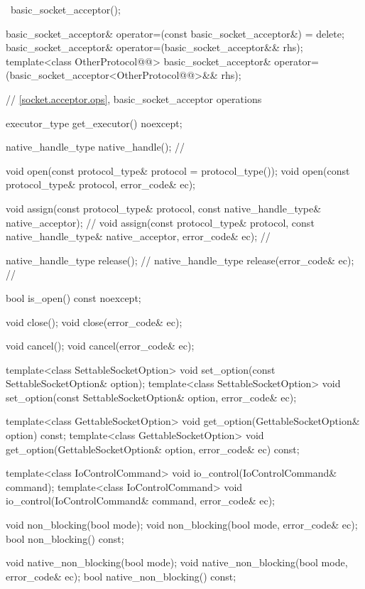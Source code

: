 \begin{codeblock}
{{    ~basic_socket_acceptor();

    basic_socket_acceptor& operator=(const basic_socket_acceptor&) = delete;
    basic_socket_acceptor& operator=(basic_socket_acceptor&& rhs);
    template<class OtherProtocol@@>
      basic_socket_acceptor& operator=(basic_socket_acceptor<OtherProtocol@@>&& rhs);

    // \ref{socket.acceptor.ops}, basic_socket_acceptor operations

    executor_type get_executor() noexcept;

    native_handle_type native_handle(); // \nativeref

    void open(const protocol_type& protocol = protocol_type());
    void open(const protocol_type& protocol, error_code& ec);

    void assign(const protocol_type& protocol,
                const native_handle_type& native_acceptor); // \nativeref
    void assign(const protocol_type& protocol,
                const native_handle_type& native_acceptor,
                error_code& ec); // \nativeref

    native_handle_type release(); // \nativeref
    native_handle_type release(error_code& ec); // \nativeref

    bool is_open() const noexcept;

    void close();
    void close(error_code& ec);

    void cancel();
    void cancel(error_code& ec);

    template<class SettableSocketOption>
      void set_option(const SettableSocketOption& option);
    template<class SettableSocketOption>
      void set_option(const SettableSocketOption& option, error_code& ec);

    template<class GettableSocketOption>
      void get_option(GettableSocketOption& option) const;
    template<class GettableSocketOption>
      void get_option(GettableSocketOption& option, error_code& ec) const;

    template<class IoControlCommand>
      void io_control(IoControlCommand& command);
    template<class IoControlCommand>
      void io_control(IoControlCommand& command, error_code& ec);

    void non_blocking(bool mode);
    void non_blocking(bool mode, error_code& ec);
    bool non_blocking() const;

    void native_non_blocking(bool mode);
    void native_non_blocking(bool mode, error_code& ec);
    bool native_non_blocking() const;

}}
\end{codeblock}
